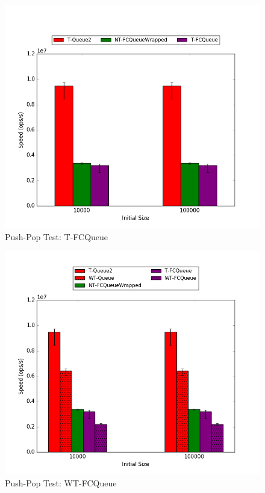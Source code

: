 \begin{figure}[H]
    \centering
	\begin{minipage}{0.5\textwidth}\includegraphics[width=\textwidth]{fcqueues/tQ:PushPop.png}
	\end{minipage}
	\begin{minipage}{0.45\textwidth}
    
	\end{minipage}
    \caption{Push-Pop Test: T-FCQueue}
    \label{fig:tqs_pushpop}
\end{figure}

\begin{figure}[H]
    \centering
	\begin{minipage}{0.5\textwidth}\includegraphics[width=\textwidth]{fcqueues/lpQ:PushPop.png}
	\end{minipage}
	\begin{minipage}{0.45\textwidth}
    
	\end{minipage}
    \caption{Push-Pop Test: WT-FCQueue}
    \label{fig:wtqs_pushpop}
\end{figure}

